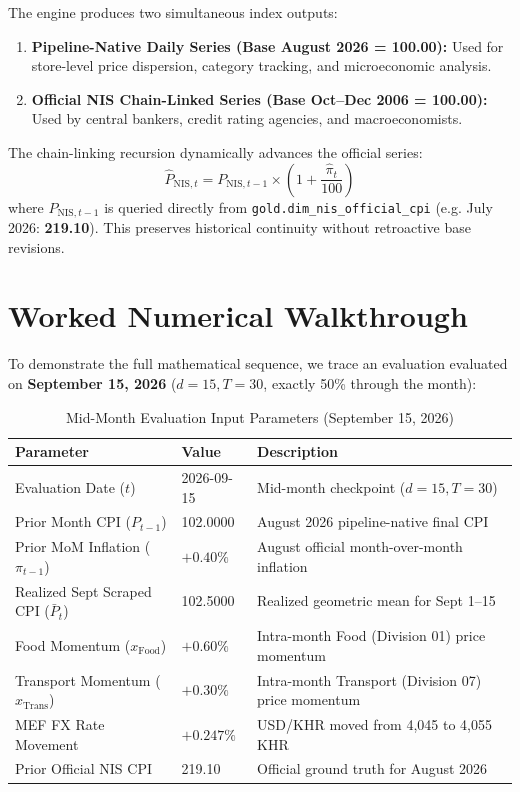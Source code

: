 \documentclass[11pt,a4paper]{article}
\begin{document}
The engine produces two simultaneous index outputs:
\begin{enumerate}
    \item \textbf{Pipeline-Native Daily Series (Base August 2026 = 100.00):} Used for store-level price dispersion, category tracking, and microeconomic analysis.
    \item \textbf{Official NIS Chain-Linked Series (Base Oct--Dec 2006 = 100.00):} Used by central bankers, credit rating agencies, and macroeconomists.
\end{enumerate}

The chain-linking recursion dynamically advances the official series:
\begin{equation}
    \hat{P}_{\text{NIS}, t} = P_{\text{NIS}, t-1} \times \left( 1 + \frac{\hat{\pi}_t}{100} \right)
\end{equation}
where $P_{\text{NIS}, t-1}$ is queried directly from \texttt{gold.dim\_nis\_official\_cpi} (e.g. July 2026: \textbf{219.10}). This preserves historical continuity without retroactive base revisions.

\section{Worked Numerical Walkthrough}

To demonstrate the full mathematical sequence, we trace an evaluation evaluated on \textbf{September 15, 2026} ($d = 15, T = 30$, exactly 50\% through the month):

\begin{table}[htbp]
\centering
\small
\caption{Mid-Month Evaluation Input Parameters (September 15, 2026)}
\vspace{4pt}
\begin{tabularx}{\textwidth}{llX}
\toprule
\textbf{Parameter} & \textbf{Value} & \textbf{Description} \\
\midrule
Evaluation Date ($t$) & 2026-09-15 & Mid-month checkpoint ($d=15, T=30$) \\
Prior Month CPI ($P_{t-1}$) & 102.0000 & August 2026 pipeline-native final CPI \\
Prior MoM Inflation ($\pi_{t-1}$) & $+0.40\%$ & August official month-over-month inflation \\
Realized Sept Scraped CPI ($\bar{P}_t$) & 102.5000 & Realized geometric mean for Sept 1--15 \\
Food Momentum ($x_{\text{Food}}$) & $+0.60\%$ & Intra-month Food (Division 01) price momentum \\
Transport Momentum ($x_{\text{Trans}}$) & $+0.30\%$ & Intra-month Transport (Division 07) price momentum \\
MEF FX Rate Movement & $+0.247\%$ & USD/KHR moved from 4,045 to 4,055 KHR \\
Prior Official NIS CPI & 219.10 & Official ground truth for August 2026 \\
\bottomrule
\end{tabularx}
\end{table}
\end{document}
